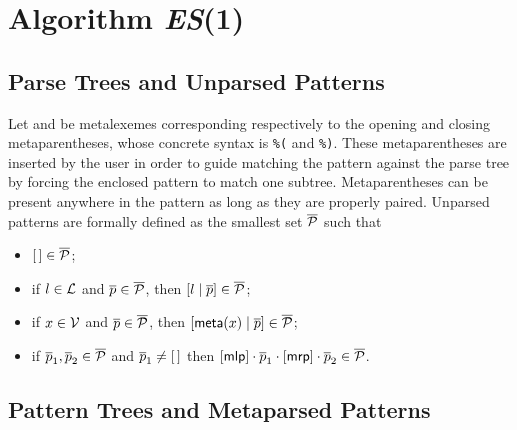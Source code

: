 
\section{Algorithm \textit{ES}(1)}
\label{es1}

\subsection{Parse Trees and Unparsed Patterns}

Let \mlp and \mrp be meta\-lexemes corresponding respectively to the
opening and closing meta\-parentheses, whose concrete syntax is
\texttt{\%(} and \texttt{\%)}. These meta\-parentheses are inserted by
the user in order to guide matching the pattern against the parse tree
by forcing the enclosed pattern to match one
subtree. Meta\-parentheses can be present anywhere in the pattern as
long as they are properly paired. Unparsed patterns are formally
defined as the smallest set \(\overline{\cal P}\) such that
\begin{itemize}

  \item \([\,] \in \overline{\cal P}\);

  \item if \(l \in {\cal L}\) and \(\overline{p} \in \overline{\cal
    P}\), then \([{l}\mid{\overline{p}}] \in \overline{\cal P}\);

  \item if \(x \in {\cal V}\) and \(\overline{p} \in \overline{\cal
    P}\), then \([{\textsf{meta}(x)}\mid{\overline{p}}] \in \overline{\cal
    P}\);

  \item if \(\overline{p}_1, \overline{p}_2 \in \overline{\cal P}\)
    and \(\overline{p}_1 \neq [\,]\) then \([\textsf{mlp}] \cdot \overline{p}_1
    \cdot [\textsf{mrp}] \cdot \overline{p}_2 \in \overline{\cal P}\). 

\end{itemize}

\subsection{Pattern Trees and Meta\-parsed Patterns}

